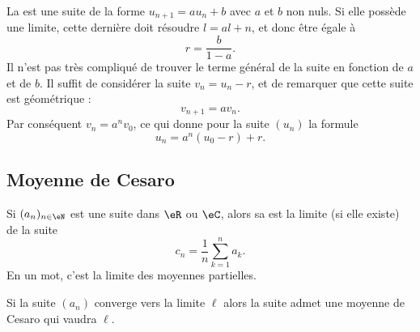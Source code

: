 \begin{example}
    La  est une suite de la forme \( u_{n+1}=au_n+b\) avec \( a\) et \( b\) non nuls. Si elle possède une limite, cette dernière doit résoudre \( l=al+n\), et donc être égale à 
    \begin{equation}
        r=\frac{ b }{ 1-a }.
    \end{equation}
    Il n'est pas très compliqué de trouver le terme général de la suite en fonction de \( a\) et de \( b\). Il suffit de considérer la suite \( v_n=u_n-r\), et de remarquer que cette suite est géométrique :
    \begin{equation}
        v_{n+1}=av_n.
    \end{equation}
    Par conséquent \( v_n=a^nv_0\), ce qui donne pour la suite \( (u_n)\) la formule
    \begin{equation}
        u_n=a^n(u_0-r)+r.
    \end{equation}
\end{example}

\subsection{Moyenne de Cesaro}

Si \( (a_n)_{n\in \eN} \) est une suite dans \( \eR\) ou \( \eC\), alors sa  est la limite (si elle existe) de la suite
\begin{equation}
    c_n=\frac{1}{ n }\sum_{k=1}^na_k.
\end{equation}
En un mot, c'est la limite des moyennes partielles.

\begin{lemma}       \label{LemyGjMqM}
    Si la suite \( (a_n)\) converge vers la limite \( \ell\) alors la suite admet une moyenne de Cesaro qui vaudra \( \ell\).
\end{lemma}

